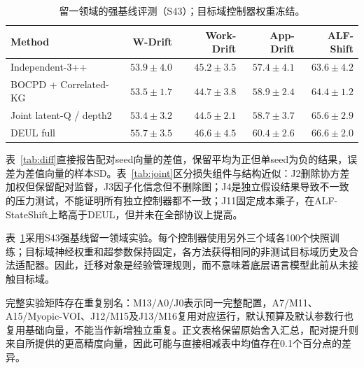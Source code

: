 \documentclass[sigconf,anonymous,review]{acmart}
\theoremstyle{zhplain}
\begin{document}


\begin{table}[t]
\centering
\caption{留一领域的强基线评测（S43）；目标域控制器权重冻结。}
\label{tab:lodo}
\small
\begin{tabular}{@{}lrrrr@{}}
\toprule
Method & W-Drift & Work-Drift & App-Drift & ALF-Shift \\
\midrule
Independent-3++ & \(53.9\!\pm\!4.0\) & \(45.2\!\pm\!3.5\) & \(57.4\!\pm\!4.1\) & \(63.6\!\pm\!4.2\) \\
BOCPD + Correlated-KG & \(53.5\!\pm\!1.7\) & \(44.7\!\pm\!3.8\) & \(58.9\!\pm\!2.4\) & \(64.4\!\pm\!1.2\) \\
Joint latent-Q / depth2 & \(53.4\!\pm\!3.2\) & \(44.5\!\pm\!2.1\) & \(58.7\!\pm\!3.7\) & \(65.6\!\pm\!2.9\) \\
DEUL full & \(55.7\!\pm\!3.5\) & \(46.6\!\pm\!4.5\) & \(60.4\!\pm\!2.6\) & \(66.6\!\pm\!2.0\) \\
\bottomrule
\end{tabular}
\end{table}


表~\ref{tab:diff}直接报告配对seed向量的差值，保留平均为正但单seed为负的结果，误差为差值向量的样本SD。表~\ref{tab:joint}区分损失组件与结构近似：J2删除协方差加权但保留配对监督，J3因子化信念但不删除图；J4是独立假设结果导致不一致的压力测试，不能证明所有独立控制器都不一致；J11固定成本乘子，在ALF-StateShift上略高于DEUL，但并未在全部协议上提高。

表~\ref{tab:lodo}采用S43强基线留一领域实验。每个控制器使用另外三个域各100个快照训练；目标域神经权重和超参数保持固定，各方法获得相同的非测试目标域历史及合法适配器。因此，迁移对象是经验管理规则，而不意味着底层语言模型此前从未接触目标域。

完整实验矩阵存在重复别名：M13/A0/J0表示同一完整配置，A7/M11、A15/Myopic-VOI、J12/M15及J13/M16复用对应运行，默认预算及默认参数行也复用基础向量，不能当作新增独立重复。正文表格保留原始舍入汇总，配对提升则来自所提供的更高精度向量，因此可能与直接相减表中均值存在0.1个百分点的差异。

\end{document}
